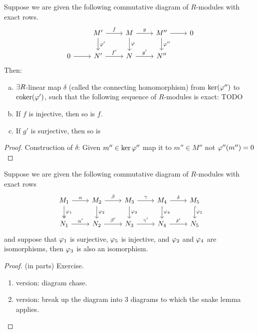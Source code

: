 \documentclass[a4paper]{report}
\begin{document}
\begin{thm}
  Suppose we are given the following commutative diagram of $R$-modules with exact rows.
  \[\begin{tikzcd}
            & M' \arrow[r, "f"] \arrow[d, "\ph'"] & M \arrow[r, "g"] \arrow[d, "\ph"] & M'' \arrow[r] \arrow[d, "\ph''"] & 0 \\
0 \arrow[r] & N' \arrow[r, "f'"]                  & N \arrow[r, "g'"]                 & N''                              &
\end{tikzcd}\]
Then:
\begin{enumerate}[(a)]
  \item $\exists R$-linear map $\delta$ (called the connecting homomorphism) from $\ker(\varphi'')$ to $\mathrm{coker}(\varphi')$, such that the following sequence of $R$-modules is exact:
        TODO
  \item If $f$ is injective, then so is $f$.
        \item If $g'$ is surjective, then so is
\end{enumerate}
\end{thm}
\begin{proof}
  Construction of $\delta$: Given $m'' \in \ker \varphi''$ map it to $m'' \in M''$ not $\varphi''(m'') = 0$

\end{proof}


\begin{thm}[5-lemma]
  Suppose we are given the following commutative diagram of $R$-modules with exact rows
  \[\begin{tikzcd}
M_1 \arrow[r, "\alpha"] \arrow[d, "\varphi_1", two heads] & M_2 \arrow[r, "\beta"] \arrow[d, "\varphi_2"] & M_3 \arrow[r, "\gamma"] \arrow[d, "\varphi_3"] & M_4 \arrow[r, "\delta"] \arrow[d, "\varphi_4"] & M_5 \arrow[d, "\varphi_5", hook] \\
N_1 \arrow[r, "\alpha'"]                                  & N_2 \arrow[r, "\beta'"]                       & N_3 \arrow[r, "\gamma'"]                       & N_4 \arrow[r, "\delta'"]                       & N_5
\end{tikzcd}\]
and suppose that $\varphi_{1}$ is surjective, $\varphi_{5}$ is injective, and $\varphi_{2}$ and $\varphi_{4}$ are isomorphisms, then $\varphi_{3}$ is also an isomorphism.
\end{thm}
\begin{proof} (in parts) Exercise.
  \begin{enumerate}
    \item version: diagram chase. %
          \item version: break up the diagram into 3 diagrams to which the snake lemma applies. \qedhere
  \end{enumerate}
\end{proof}
\end{document}
